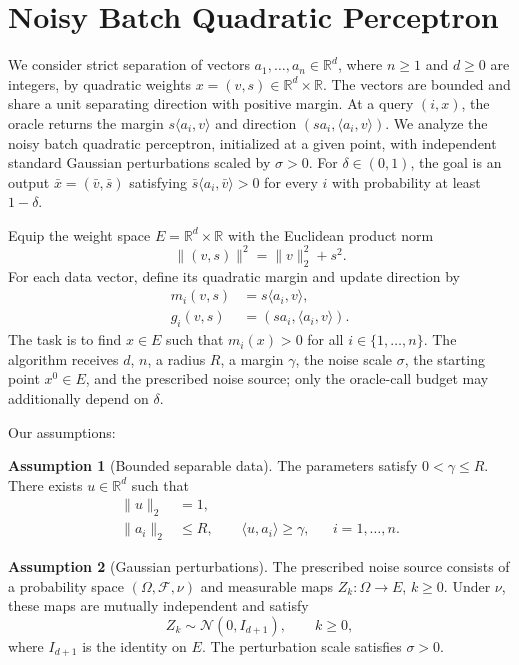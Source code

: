 \documentclass[10pt]{article}
\theoremstyle{definition}
\newtheorem{assumption}{Assumption}
\begin{document}
\section*{Noisy Batch Quadratic Perceptron}
We consider strict separation of vectors $a_1,\ldots,a_n\in\mathbb{R}^d$, where $n\geq1$ and $d\geq0$ are integers, by quadratic weights $x=(v,s)\in\mathbb{R}^d\times\mathbb{R}$. The vectors are bounded and share a unit separating direction with positive margin. At a query $(i,x)$, the oracle returns the margin $s\langle a_i,v\rangle$ and direction $(s a_i,\langle a_i,v\rangle)$. We analyze the noisy batch quadratic perceptron, initialized at a given point, with independent standard Gaussian perturbations scaled by $\sigma>0$. For $\delta\in(0,1)$, the goal is an output $\bar{x}=(\bar{v},\bar{s})$ satisfying $\bar{s}\langle a_i,\bar{v}\rangle>0$ for every $i$ with probability at least $1-\delta$.

Equip the weight space $E=\mathbb{R}^d\times\mathbb{R}$ with the Euclidean product norm
\[
\|(v,s)\|^2=\|v\|_2^2+s^2.
\]
For each data vector, define its quadratic margin and update direction by
\[
\begin{aligned}
m_i(v,s)&=s\langle a_i,v\rangle,\\
g_i(v,s)&=(s a_i,\langle a_i,v\rangle).
\end{aligned}
\]
The task is to find $x\in E$ such that $m_i(x)>0$ for all $i\in\{1,\ldots,n\}$. The algorithm receives $d$, $n$, a radius $R$, a margin $\gamma$, the noise scale $\sigma$, the starting point $x^0\in E$, and the prescribed noise source; only the oracle-call budget may additionally depend on $\delta$.

Our assumptions:
\begin{assumption}[Bounded separable data]
The parameters satisfy $0<\gamma\leq R$. There exists $u\in\mathbb{R}^d$ such that
\[
\begin{aligned}
\|u\|_2&=1,\\
\|a_i\|_2&\leq R,\qquad
\langle u,a_i\rangle\geq\gamma,
&&i=1,\ldots,n.
\end{aligned}
\]
\end{assumption}

\begin{assumption}[Gaussian perturbations]
The prescribed noise source consists of a probability space $(\Omega,\mathcal{F},\nu)$ and measurable maps $Z_k:\Omega\to E$, $k\geq0$. Under $\nu$, these maps are mutually independent and satisfy
\[
Z_k\sim\mathcal{N}(0,I_{d+1}),\qquad k\geq0,
\]
where $I_{d+1}$ is the identity on $E$. The perturbation scale satisfies $\sigma>0$.
\end{assumption}
\end{document}

